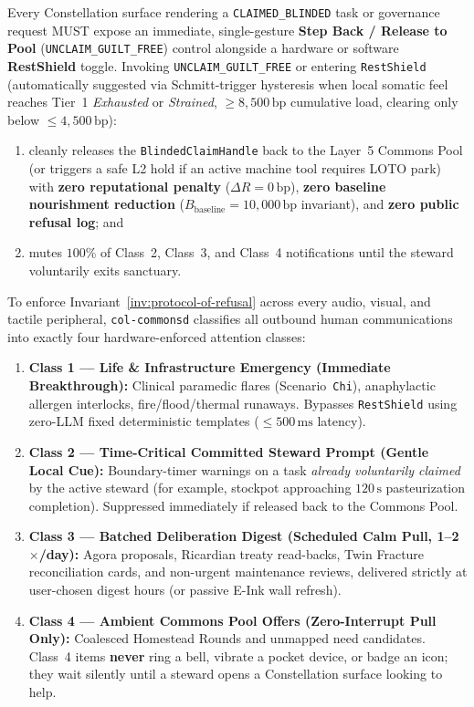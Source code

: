 \begin{invariant}
\label{inv:protocol-of-refusal}
Every Constellation surface rendering a \texttt{CLAIMED\_BLINDED} task or governance request MUST expose an immediate, single-gesture \textbf{Step Back / Release to Pool} (\texttt{UNCLAIM\_GUILT\_FREE}) control alongside a hardware or software \textbf{RestShield} toggle. Invoking \texttt{UNCLAIM\_GUILT\_FREE} or entering \texttt{RestShield} (automatically suggested via Schmitt-trigger hysteresis when local somatic feel reaches Tier~1 \textit{Exhausted} or \textit{Strained}, $\ge 8{,}500\,\mathrm{bp}$ cumulative load, clearing only below $\le 4{,}500\,\mathrm{bp}$):
\begin{enumerate}
    \item cleanly releases the \texttt{BlindedClaimHandle} back to the Layer~5 Commons Pool (or triggers a safe L2 hold if an active machine tool requires LOTO park) with \textbf{zero reputational penalty} ($\Delta R = 0\,\mathrm{bp}$), \textbf{zero baseline nourishment reduction} ($B_{\mathrm{baseline}} = 10{,}000\,\mathrm{bp}$ invariant), and \textbf{zero public refusal log}; and
    \item mutes $100\%$ of Class~2, Class~3, and Class~4 notifications until the steward voluntarily exits sanctuary.
\end{enumerate}
\end{invariant}

To enforce Invariant~\ref{inv:protocol-of-refusal} across every audio, visual, and tactile peripheral, \texttt{col-commonsd} classifies all outbound human communications into exactly four hardware-enforced attention classes:
\begin{enumerate}
    \item \textbf{Class 1 --- Life \& Infrastructure Emergency (Immediate Breakthrough):} Clinical paramedic flares (Scenario~\texttt{Chi}), anaphylactic allergen interlocks, fire/flood/thermal runaways. Bypasses \texttt{RestShield} using zero-LLM fixed deterministic templates ($\le 500\,\mathrm{ms}$ latency).
    \item \textbf{Class 2 --- Time-Critical Committed Steward Prompt (Gentle Local Cue):} Boundary-timer warnings on a task \textit{already voluntarily claimed} by the active steward (for example, stockpot approaching $120\,\mathrm{s}$ pasteurization completion). Suppressed immediately if released back to the Commons Pool.
    \item \textbf{Class 3 --- Batched Deliberation Digest (Scheduled Calm Pull, 1--2$\times$/day):} Agora proposals, Ricardian treaty read-backs, Twin Fracture reconciliation cards, and non-urgent maintenance reviews, delivered strictly at user-chosen digest hours (or passive E-Ink wall refresh).
    \item \textbf{Class 4 --- Ambient Commons Pool Offers (Zero-Interrupt Pull Only):} Coalesced Homestead Rounds and unmapped need candidates. Class~4 items \textbf{never} ring a bell, vibrate a pocket device, or badge an icon; they wait silently until a steward opens a Constellation surface looking to help.
\end{enumerate}

